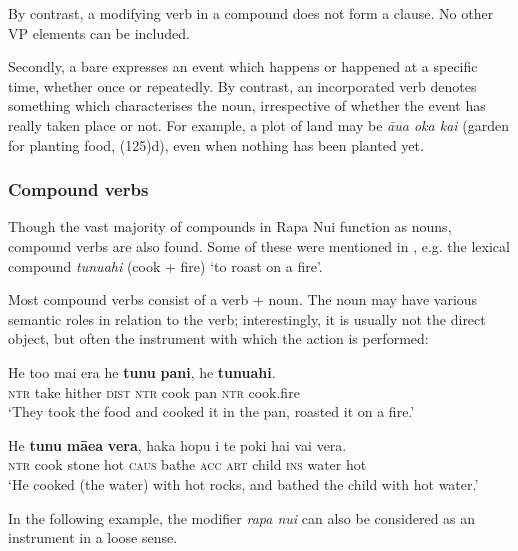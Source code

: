 By contrast, a modifying verb in a compound does not form a clause. No other VP elements can be included. 

Secondly, a bare  expresses an event which happens or happened at a specific time, whether once or repeatedly. By contrast, an incorporated verb denotes something which characterises the noun, irrespective of whether the event has really taken place or not. For example, a plot of land may be \textit{{\ꞌ}āua {\ꞌ}oka kai} (garden for planting food, (125)d), even when nothing has been planted yet. 

\subsubsection[Compound verbs]{Compound verbs}\label{sec:5.7.2.4}

Though the vast majority of compounds in Rapa Nui function as nouns, compound verbs are also found. Some of these were mentioned in , e.g. the lexical compound \textit{tunuahi} (cook + fire) ‘to roast on a fire’. 

Most compound verbs consist of a verb + noun. The noun may have various semantic roles in relation to the verb; interestingly, it is usually not the direct object, but often the instrument with which the action is performed:

\ea\label{ex:5.132}
\gll He to{\ꞌ}o mai era he \textbf{tunu} \textbf{pani}, he \textbf{tunuahi}. \\
\textsc{ntr} take hither \textsc{dist} \textsc{ntr} cook pan \textsc{ntr} cook.fire \\

\glt 
‘They took the food and cooked it in the pan, roasted it on a fire.’ \textstyleExampleref{[R107.049]} 
\z

\ea\label{ex:5.133}
\gll He \textbf{tunu} \textbf{mā{\ꞌ}ea} \textbf{vera}, haka hopu i te poki hai vai vera. \\
\textsc{ntr} cook stone hot \textsc{caus} bathe \textsc{acc} \textsc{art} child \textsc{ins} water hot \\

\glt
‘He cooked (the water) with hot rocks, and bathed the child with hot water.’ \textstyleExampleref{[Mtx-1-07.016]}
\z

In the following example, the modifier \textit{rapa nui} can also be considered as an instrument in a loose sense.

